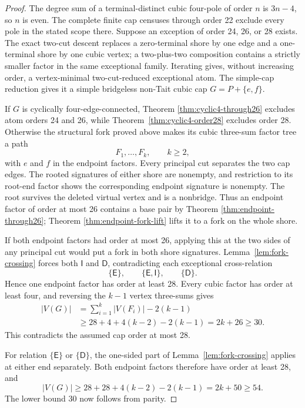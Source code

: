 \documentclass[11pt]{article}
\theoremstyle{definition}
\theoremstyle{remark}
\begin{document}
\begin{proof}
The degree sum of a terminal-distinct cubic four-pole of order \(n\)
is \(3n-4\), so \(n\) is even.  The complete finite cap censuses through
order 22 exclude every pole in the stated scope there.  Suppose an
exception of order 24, 26, or 28 exists.  The exact two-cut descent replaces
a zero-terminal shore by one edge and a one-terminal shore by one
cubic vertex; a two-plus-two composition contains a strictly smaller
factor in the same exceptional family.  Iterating gives, without
increasing order, a vertex-minimal two-cut-reduced exceptional atom.
The simple-cap reduction gives it a simple bridgeless non-Tait cubic
cap \(G=P+\{e,f\}\).

If \(G\) is cyclically four-edge-connected, Theorem
\ref{thm:cyclic4-through26} excludes atom orders 24 and 26, while
Theorem~\ref{thm:cyclic4-order28} excludes order 28.  Otherwise the structural fork
proved above makes its cubic three-sum factor tree a path
\[
                            F_1,\ldots,F_k,\qquad k\ge2,
\]
with \(e\) and \(f\) in the endpoint factors.  Every principal cut
separates the two cap edges.  The rooted signatures of either shore
are nonempty, and restriction to its root-end factor shows the
corresponding endpoint signature is nonempty.  The root survives the
deleted virtual vertex and is a nonbridge.  Thus an endpoint factor of
order at most 26 contains a base pair by Theorem
\ref{thm:endpoint-through26}; Theorem
\ref{thm:endpoint-fork-lift} lifts it to a fork on the whole shore.

If both endpoint factors had order at most 26, applying this at the
two sides of any principal cut would put a fork in both shore
signatures.  Lemma~\ref{lem:fork-crossing} forces both
\(\mathsf I\) and \(\mathsf D\), contradicting each exceptional
cross-relation
\[
            \{\mathsf E\},\qquad
            \{\mathsf E,\mathsf I\},\qquad
            \{\mathsf D\}.
\]
Hence one endpoint factor has order at least 28.  Every cubic factor
has order at least four, and reversing the \(k-1\) vertex three-sums
gives
\[
\begin{aligned}
 |V(G)|
   &=\sum_{i=1}^k|V(F_i)|-2(k-1)\\
   &\ge28+4+4(k-2)-2(k-1)
    =2k+26\ge30.
\end{aligned}
\]
This contradicts the assumed cap order at most 28.

For relation \(\{\mathsf E\}\) or \(\{\mathsf D\}\), the one-sided
part of Lemma~\ref{lem:fork-crossing} applies at either end separately.
Both endpoint factors therefore have order at least 28, and
\[
 |V(G)|\ge28+28+4(k-2)-2(k-1)=2k+50\ge54.
\]
The lower bound 30 now follows from parity.
\end{proof}
\end{document}
